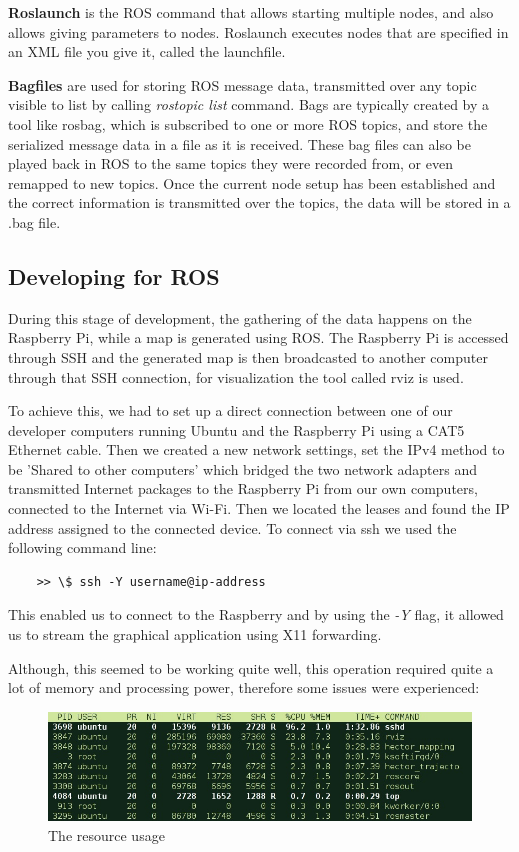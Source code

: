\textbf{Roslaunch} is the ROS command that allows starting multiple nodes, and also allows giving parameters to nodes. Roslaunch executes nodes that are specified in an XML file you give it, called the launchfile.

\textbf{Bagfiles} are used for storing ROS message data, transmitted over any topic visible to list by calling \textit{rostopic list} command. Bags are typically created by a tool like rosbag, which is subscribed to one or more ROS topics, and store the serialized message data in a file as it is received. These bag files can also be played back in ROS to the same topics they were recorded from, or even remapped to new topics. Once the current node setup has been established and the correct information is transmitted over the topics, the data will be stored in a .bag file.

\subsection{Developing for ROS}
During this stage of development, the gathering of the data happens on the Raspberry Pi, while a map is generated using ROS. The Raspberry Pi is accessed through SSH and the generated map is then broadcasted to another computer through that SSH connection, for visualization the tool called rviz is used. 

To achieve this, we had to set up a direct connection between one of our developer computers running Ubuntu and the Raspberry Pi using a CAT5 Ethernet cable. Then we created a new network settings, set the IPv4 method to be 'Shared to other computers' which bridged the two network adapters and transmitted Internet packages to the Raspberry Pi from our own computers, connected to the Internet via Wi-Fi. Then we located the leases and found the IP address assigned to the connected device. To connect via ssh we used the following command line:
\lstset{language=sh}
\begin{lstlisting}
	>> \$ ssh -Y username@ip-address
\end{lstlisting}
This enabled us to connect to the Raspberry and by using the \textit{-Y} flag, it allowed us to stream the graphical application using X11 forwarding.

Although, this seemed to be working quite well, this operation required quite a lot of memory and processing power, therefore some issues were experienced:

\begin{figure}[H]
	\centering
	\includegraphics[width=.8\linewidth]{images/rvisScreenshotCropped.jpg}
	\caption{The resource usage}
	\label{resources_used}
\end{figure}

